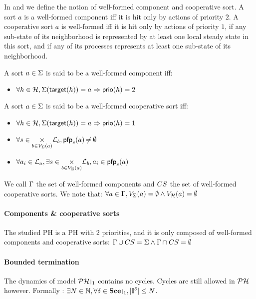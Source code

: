 In  and  we define the notion of well-formed component and cooperative sort.
A sort $a$ is a well-formed component iff
it is hit only by actions of priority $2$.
A cooperative sort $a$ is well-formed iff
it is hit only by actions of priority $1$,
if any sub-state of its neighborhood is represented by at least one local steady state in this sort,
and if any of its processes represents at least one sub-state of its neighborhood.
\begin{definition}
\label{def:component}
  A sort $a \in \Sigma$ is said to be a well-formed component iff:
  \begin{itemize}
    \item $\forall h \in \mathcal{H}, \Sigma(\mathsf{target}(h)) = a \Rightarrow \mathsf{prio}(h) = 2$
  \end{itemize}
\end{definition}
\begin{definition}
  \label{def:cs}
  A sort $a \in \Sigma$ is said to be a well-formed cooperative sort iff:
  \begin{itemize}
    \item $\forall h \in \mathcal{H}, \Sigma(\mathsf{target}(h)) = a \Rightarrow \mathsf{prio}(h) = 1$
    \item $\forall s \in \underset{b \in V_\Sigma(a)}{\times} \mathcal{L}_b, \mathsf{pfp}_s(a) \not\nobreak\mkern -2mu = \emptyset$
    \item $\forall a_i \in \mathcal{L}_a, \exists s \in \underset{b \in V_\Sigma(a)}{\times} \mathcal{L}_b, a_i \in \mathsf{pfp}_s(a)$
  \end{itemize}
\end{definition}

We call $\Gamma$ the set of well-formed components and $CS$ the set of well-formed cooperative sorts.
We note that: $\forall a \in \Gamma, V_\Sigma(a) = \emptyset \wedge V_{\mathcal{H}}(a) = \emptyset$

\paragraph{Components \& cooperative sorts}
The studied PH is a PH with 2 priorities, and it is only composed of well-formed components and cooperative sorts:
$\Gamma \cup CS = \Sigma \wedge \Gamma \cap CS = \emptyset$

\paragraph{Bounded termination}
The dynamics of model $\restriction{\PH}{1}$ contains no cycles. Cycles are still allowed in $\mathcal{PH}$ however.
Formally : $\exists N \in \sN, \forall \delta \in \restriction{\Sce}{1}, |\indexes{\delta}| \leq N$.



